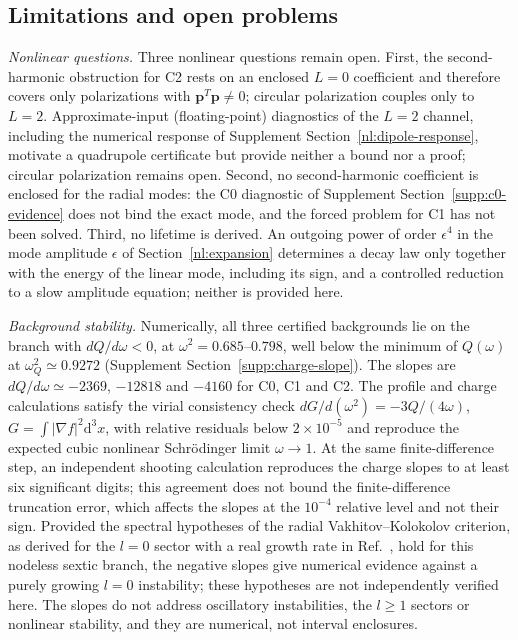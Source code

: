 \documentclass[a4paper,11pt]{article}
\newcommand{\dd}{\mathrm{d}}
\begin{document}
\subsection*{Limitations and open problems}
\emph{Nonlinear questions.} Three nonlinear questions remain open.
First, the second-harmonic obstruction for C2 rests on an enclosed
$L=0$ coefficient and therefore covers only polarizations with
$\boldsymbol p^T\boldsymbol p\ne0$; circular polarization couples only to
$L=2$. Approximate-input (floating-point) diagnostics of the $L=2$
channel, including the numerical response of Supplement
Section~\ref{nl:dipole-response}, motivate a quadrupole certificate but
provide neither a bound nor a proof; circular polarization remains
open. Second, no
second-harmonic coefficient is enclosed for the radial modes: the C0
diagnostic of Supplement Section~\ref{supp:c0-evidence} does not bind
the exact mode, and the forced problem for C1 has not been solved.
Third, no lifetime is derived. An outgoing power of order $\epsilon^4$
in the mode amplitude $\epsilon$ of Section~\ref{nl:expansion}
determines a decay law only together with the energy of the linear mode,
including its sign, and a controlled reduction to a slow amplitude
equation; neither is provided here.

\emph{Background stability.} Numerically, all three certified
backgrounds lie on the branch with $dQ/d\omega<0$, at
$\omega^2=0.685$--$0.798$, well below the minimum of $Q(\omega)$ at
$\omega_Q^2\simeq0.9272$ (Supplement Section~\ref{supp:charge-slope}).
The slopes are $dQ/d\omega\simeq-2369$, $-12818$ and $-4160$ for C0, C1
and C2. The profile and charge calculations satisfy the virial
consistency check $dG/d(\omega^2)=-3Q/(4\omega)$,
$G=\int|\nabla f|^2\dd^3x$, with relative residuals below
$2\times10^{-5}$ and reproduce the expected cubic nonlinear
Schr\"odinger limit $\omega\to1$. At the same finite-difference step,
an independent shooting calculation reproduces the charge slopes to at
least six significant digits; this agreement does not bound the
finite-difference truncation error, which affects the slopes at the
$10^{-4}$ relative level and not their sign. Provided the spectral
hypotheses of the radial Vakhitov--Kolokolov criterion, as derived for
the $l=0$ sector with a real growth rate in Ref.~\cite{Kovtun2018}, hold
for this nodeless sextic branch, the negative slopes give numerical
evidence against a purely growing $l=0$ instability; these hypotheses
are not independently verified here. The slopes do not address
oscillatory instabilities, the $l\ge1$ sectors or nonlinear stability,
and they are numerical, not interval enclosures.
\end{document}

